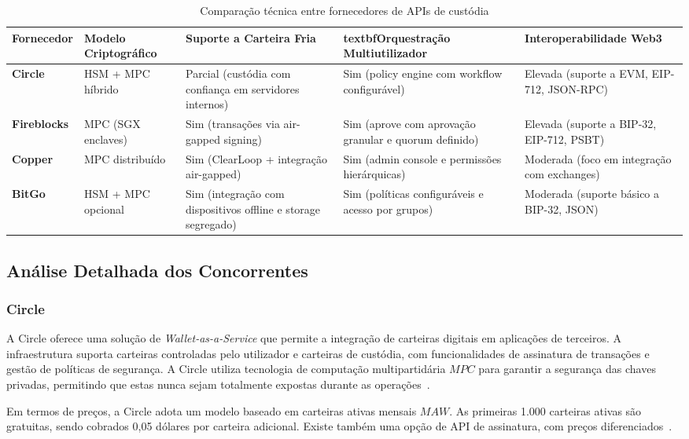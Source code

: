 \begin{table}[h]
    \centering
    \caption{Comparação técnica entre fornecedores de APIs de custódia}
    \label{tab:concorrentes}
    \begin{tabular}{|p{3cm}|p{2.7cm}|p{2.5cm}|p{3cm}|p{3cm}|}
        \hline
        \textbf{Fornecedor} & \textbf{Modelo Criptográfico} & \textbf{Suporte a Carteira Fria} & textbf{Orquestração Multiutilizador} & \textbf{Interoperabilidade Web3} \\ \hline
        \textbf{Circle} & HSM + MPC híbrido & Parcial (custódia com confiança em servidores internos) & Sim (policy engine com workflow configurável) & Elevada (suporte a EVM, EIP-712, JSON-RPC) \\ \hline
        \textbf{Fireblocks} & MPC (SGX enclaves) & Sim (transações via air-gapped signing) & Sim (aprove com aprovação granular e quorum definido) & Elevada (suporte a BIP-32, EIP-712, PSBT) \\ \hline
        \textbf{Copper} & MPC distribuído & Sim (ClearLoop + integração air-gapped) & Sim (admin console e permissões hierárquicas) & Moderada (foco em integração com exchanges) \\ \hline
        \textbf{BitGo} & HSM + MPC opcional & Sim (integração com dispositivos offline e storage segregado) & Sim (políticas configuráveis e acesso por grupos) & Moderada (suporte básico a BIP-32, JSON) \\ \hline
    \end{tabular}
\end{table}

\subsection{Análise Detalhada dos Concorrentes}
\subsubsection{Circle}
A Circle oferece uma solução de \textit{Wallet-as-a-Service} que permite a integração de carteiras digitais em aplicações de terceiros. A infraestrutura suporta carteiras controladas pelo utilizador e carteiras de custódia, com funcionalidades de assinatura de transações e gestão de políticas de segurança. A Circle utiliza tecnologia de computação multipartidária \(MPC\) para garantir a segurança das chaves privadas, permitindo que estas nunca sejam totalmente expostas durante as operações~\cite{circle2023, quicknode2023}.

Em termos de preços, a Circle adota um modelo baseado em carteiras ativas mensais \(MAW\). As primeiras 1.000 carteiras ativas são gratuitas, sendo cobrados 0,05 dólares por carteira adicional. Existe também uma opção de API de assinatura, com preços diferenciados~\cite{circlepricing2023}.

